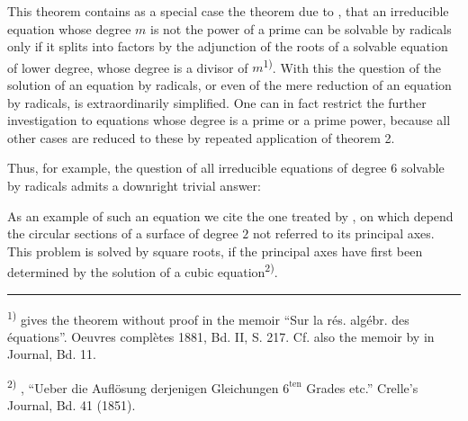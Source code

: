 
This theorem contains as a special case the theorem due to ,
that an irreducible equation whose degree $m$ is not the power of a prime can
be solvable by radicals only if it splits into factors by the adjunction of
the roots of a solvable equation of lower degree, whose degree is a divisor of
$m$\textsuperscript{1)}. With this the question of the solution of an equation
by radicals, or even of the mere reduction of an equation by radicals, is
extraordinarily simplified. One can in fact restrict the further investigation
to equations whose degree is a prime or a prime power, because all other cases
are reduced to these by repeated application of theorem 2.

Thus, for example, the question of all irreducible equations of degree $6$
solvable by radicals admits a downright trivial answer:


As an example of such an equation we cite the one treated by ,
on which depend the circular sections of a surface of degree $2$ not
referred to its principal axes. This problem is solved by square roots, if the
principal axes have first been determined by the solution of a cubic
equation\textsuperscript{2)}.

\noindent\rule{4cm}{0.4pt}\par
\textsuperscript{1)}  gives the theorem without proof in the
memoir ``Sur la rés. algébr. des équations''. Oeuvres complètes
1881, Bd. II, S. 217. Cf. also the memoir by  in
 Journal, Bd. 11.\par
\textsuperscript{2)} , ``Ueber die Auflösung derjenigen
Gleichungen $6^{\mathrm{ten}}$ Grades etc.'' Crelle's Journal, Bd. 41
(1851).
